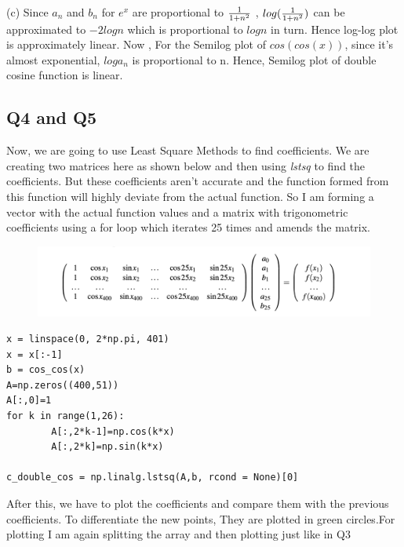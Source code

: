 \documentclass[12pt, a4paper]{report}
\begin{document}
(c) Since $a_n$ and $b_n$ for $e^x$ are proportional to ${1\over{1+n^2}}$ ,  $log({1\over{1+n^2}})$ can be approximated to $-2logn$ which is proportional to $logn$ in turn. Hence log-log plot is approximately linear. Now , For the Semilog plot of $cos(cos(x))$, since it's almost exponential, $log{a_n}$ is proportional to n. Hence, Semilog plot of double cosine function is linear.
   


 \subsection{Q4 and Q5}
 Now, we are going to use Least Square Methods to find coefficients. We are creating two matrices here as shown below and then using \textit{lstsq} to find the coefficients. But these coefficients aren't accurate and the function formed from this function will highly deviate from the actual function. So I am forming a vector with the actual function values and a matrix with trigonometric coefficients using a for loop which iterates 25 times and amends the matrix.
 
 
\begin{figure}[!tbh]
   	\centering
   	\includegraphics[scale=1]{3.png}
   	\label{fig:sample}
   \end{figure}
   
   
 \begin{Verbatim}
x = linspace(0, 2*np.pi, 401)
x = x[:-1]
b = cos_cos(x)
A=np.zeros((400,51)) 
A[:,0]=1
for k in range(1,26):
        A[:,2*k-1]=np.cos(k*x)
        A[:,2*k]=np.sin(k*x)

c_double_cos = np.linalg.lstsq(A,b, rcond = None)[0]
\end{Verbatim}

After this, we have to plot the coefficients and compare them with the previous coefficients. To differentiate the new points, They are plotted in green circles.For plotting I am again splitting the array and then plotting just like in Q3
\end{document}
